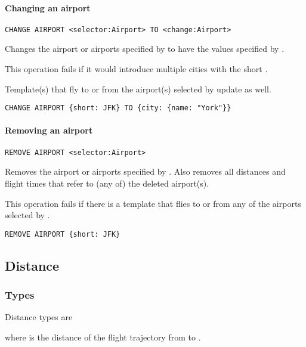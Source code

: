 \paragraph{Changing an airport}
\begin{operation}
  \lstinline{CHANGE AIRPORT <selector:Airport> TO <change:Airport>}
  \label{op:change_airport}
\end{operation}
Changes the airport or airports specified by  to have the values
specified by .

This operation fails if it would introduce multiple cities with the short
.

Template(s) that fly to or from the airport(s) selected by  update
as well.

\begin{texa}
  \lstinline|CHANGE AIRPORT {short: JFK} TO {city: {name: "York"}}|
\end{texa}


\paragraph{Removing an airport}
\begin{operation}
  \lstinline{REMOVE AIRPORT <selector:Airport>}
  \label{op:remove_airport}
\end{operation}
Removes the airport or airports specified by . Also removes all
distances and flight times that refer to (any of) the deleted airport(s).

This operation fails if there is a template that flies to or from any of the
airports selected by .

\begin{texa}
  \lstinline|REMOVE AIRPORT {short: JFK}|
\end{texa}


\subsection{Distance}
\subsubsection{Types}
Distance types are
\begin{description}
  \item[] 
  \item[] 
\end{description}
where  is the distance of the flight trajectory from  to
.
